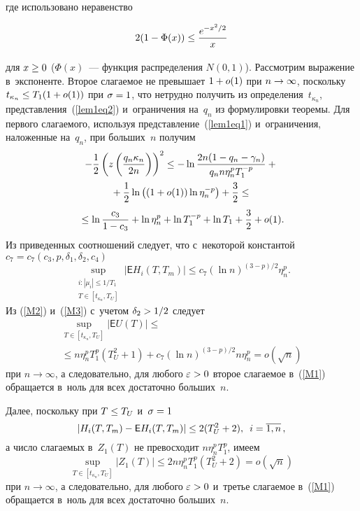 \begin{multicols}{2}
\vspace*{-2pt}

\noindent
где использовано неравенство 

\noindent
$$
2(1-\Phi(x))\hm \leq \fr{e^{-x^2/2}}{x}
$$

\pagebreak


\noindent
 для $x\hm\geq 0$ 
($\Phi(x)$~--- функция распределения $N(0,1)$). Рас\-смот\-рим выражение 
в~экспоненте. Второе слагаемое не превышает $1\hm+o(1)$ при $n\hm\to\infty$, поскольку 
$t_{\kappa_n} \hm\leq T_1 (1+o(1))$ при $\sigma\hm=1$, что нетрудно получить из 
определения~$t_{\kappa_n}$, пред\-став\-ле\-ния~(\ref{lem1eq2}) и~ограничения на~$q_n$ 
из формулировки тео\-ре\-мы. Для первого слагаемого, используя пред\-став\-ле\-ние~(\ref{lem1eq1}) 
и~ограничения, наложенные на~$q_n$, при больших~$n$ получим
\begin{multline*}
-\displaystyle\frac{\displaystyle 1\mathstrut}{\displaystyle 2\mathstrut}\left(z\left(\displaystyle\frac{\displaystyle q_n \kappa_n\mathstrut}{\displaystyle 2n\mathstrut}\right)\right)^2 \leq - \ln 
\displaystyle\frac{\displaystyle 2n (1-q_n-\gamma_n)\mathstrut}{\displaystyle q_n n \eta_n^p T_1^{-p}\mathstrut} + {}\\
{}+\displaystyle\frac{\displaystyle 1\mathstrut}{\displaystyle 2\mathstrut} \ln 
\left((1+o(1)) \ln \eta_n^{-p}\right) + \displaystyle\frac{\displaystyle 3\mathstrut}{\displaystyle 2\mathstrut} \leq{}\\
{}\leq \ln \displaystyle\frac{\displaystyle c_3\mathstrut}{\displaystyle 1-c_3\mathstrut} + \ln \eta_n^p + \ln T_1^{-p} + \ln T_1 + 
\displaystyle\frac{\displaystyle 3\mathstrut}{\displaystyle 2\mathstrut}+ o(1).
\end{multline*}
Из приведенных соотношений следует, что с~некоторой константой $c_7 = c_7(c_3, 
p, \delta_1, \delta_2, c_4)$
\begin{equation}\label{M3}
\sup\limits_{\substack{i: |\mu_i| \leq 1/T_1 \\ T\in [t_{\kappa_n}, T_U]}} |{\mathsf E} 
H_i (T, T_m)|  \leq c_7 (\ln n)^{(3-p)/2}\eta_n^p.
\end{equation}
Из (\ref{M2}) и~(\ref{M3}) с~учетом $\delta_2 \hm> 1/2$ следует
\begin{multline*}
\sup\limits_{T\in [t_{\kappa_n}, T_U]} |{\mathsf E} U(T)| \leq{}\\
{}\leq 
 n\eta_n^p T_1^p 
(T_U^2+1) + c_7 (\ln n)^{(3-p)/2} n \eta_n^p = o(\sqrt{n})
\end{multline*}
при $n\to\infty$, а следовательно, для любого $\eps\hm>0$ второе слагаемое в~(\ref{M1}) обращается в~ноль для всех достаточно больших~$n$.

Далее, поскольку при $T \hm\leq T_U$ и~$\sigma\hm=1$
$$
|H_i(T, T_m) - {\mathsf E} H_i(T, T_m)| \leq 2 (T_U^2 +2), \enskip i=\overline{1, n}\,,
$$
а число слагаемых в~$Z_1(T)$ не превосходит $n\eta_n^p T_1^p$, имеем
$$
\sup\limits_{T\in [t_{\kappa_n}, T_U]} |Z_1(T)|  \leq 2 n\eta_n^p T_1^p (T_U^2 
+2) = o(\sqrt{n})
$$
при $n\to\infty$, а следовательно, для любого $\eps\hm>0$ и~третье слагаемое в~(\ref{M1}) обращается в~ноль для всех достаточно больших~$n$.


\end{multicols}
